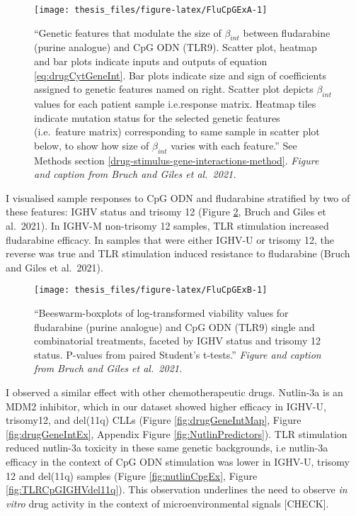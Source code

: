 \documentclass[11pt, a4paper, twosided]{book}
\begin{document}
\begin{figure}

{\centering \texttt{[image: thesis\_files/figure-latex/FluCpGExA-1]} 

}

\caption{``Genetic features that modulate the size of \(\beta_{int}\) between fludarabine (purine analogue) and CpG ODN (TLR9). Scatter plot, heatmap and bar plots indicate inputs and outputs of equation \eqref{eq:drugCytGeneInt}. Bar plots indicate size and sign of coefficients assigned to genetic features named on right. Scatter plot depicts \(\beta_{int}\) values for each patient sample i.e.response matrix. Heatmap tiles indicate mutation status for the selected genetic features (i.e.~feature matrix) corresponding to same sample in scatter plot below, to show how size of \(\beta_{int}\) varies with each feature.'' See Methods section \ref{drug-stimulus-gene-interactions-method}. \emph{Figure and caption from Bruch and Giles et al.~2021.}}\label{fig:FluCpGExA}
\end{figure}
I visualised sample responses to CpG ODN and fludarabine stratified by two of these features: IGHV status and trisomy 12 (Figure \ref{fig:FluCpGExB}, Bruch and Giles et al.~2021). In IGHV-M non-trisomy 12 samples, TLR stimulation increased fludarabine efficacy. In samples that were either IGHV-U or trisomy 12, the reverse was true and TLR stimulation induced resistance to fludarabine (Bruch and Giles et al.~2021).


\begin{figure}

{\centering \texttt{[image: thesis\_files/figure-latex/FluCpGExB-1]} 

}

\caption{``Beeswarm-boxplots of log-transformed viability values for fludarabine (purine analogue) and CpG ODN (TLR9) single and combinatorial treatments, faceted by IGHV status and trisomy 12 status. P-values from paired Student's t-tests.'' \emph{Figure and caption from Bruch and Giles et al.~2021.}}\label{fig:FluCpGExB}
\end{figure}
I observed a similar effect with other chemotherapeutic drugs. Nutlin-3a is an MDM2 inhibitor, which in our dataset showed higher efficacy in IGHV-U, trisomy12, and del(11q) CLLs (Figure \ref{fig:drugGeneIntMap}, Figure \ref{fig:drugGeneIntEx}, Appendix Figure \ref{fig:NutlinPredictors}). TLR stimulation reduced nutlin-3a toxicity in these same genetic backgrounds, i.e nutlin-3a efficacy in the context of CpG ODN stimulation was lower in IGHV-U, trisomy 12 and del(11q) samples (Figure \ref{fig:nutlinCpgEx}, Figure \ref{fig:TLRCpGIGHVdel11q}). This observation underlines the need to observe \emph{in vitro} drug activity in the context of microenvironmental signals {[}CHECK{]}.
\end{document}
